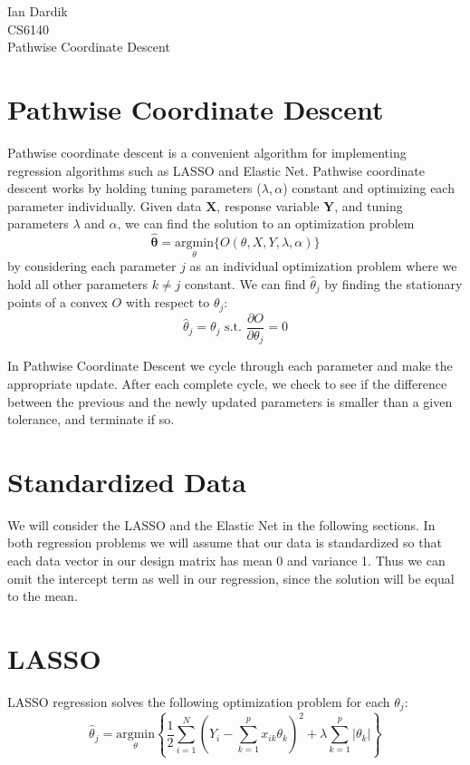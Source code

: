 \documentclass[12pt]{article}
\newcommand{\bY}{\mathbf{Y}}
\newcommand{\bX}{\mathbf{X}}
\newcommand{\thh}{\hat{\theta}}
\begin{document}
Ian Dardik \\
CS6140 \\
Pathwise Coordinate Descent

\section{Pathwise Coordinate Descent}
Pathwise coordinate descent is a convenient algorithm for implementing regression algorithms such as LASSO and Elastic Net.  Pathwise coordinate descent works by holding tuning parameters ($\lambda, \alpha$) constant and optimizing each parameter individually\cite{ht}.  Given data $\bX$, response variable $\bY$, and tuning parameters $\lambda$ and $\alpha$, we can find the solution to an optimization problem
	$$\mathbf{\thh} = \underset{\theta}{\text{argmin}}\{O(\theta,X,Y,\lambda,\alpha)\}$$
by considering each parameter $j$ as an individual optimization problem where we hold all other parameters $k \ne j$ constant.  We can find $\thh_j$ by finding the stationary points of a convex $O$ with respect to $\theta_j$:
	$$\thh_j = \theta_j \text{ s.t. } \frac{\partial O}{\partial \theta_j} = 0$$

In Pathwise Coordinate Descent we cycle through each parameter and make the appropriate update.  After each complete cycle, we check to see if the difference between the previous and the newly updated parameters is smaller than a given tolerance, and terminate if so.  


\section{Standardized Data}
We will consider the LASSO and the Elastic Net in the following sections.  In both regression problems we will assume that our data is standardized so that each data vector in our design matrix has mean 0 and variance 1.  Thus we can omit the intercept term as well in our regression, since the solution will be equal to the mean\cite{ht}.  


\section{LASSO}
LASSO regression solves the following optimization problem for each $\theta_j$\cite{ht}:
	$$\thh_j = \underset{\theta}{\text{argmin}}\left\{ \frac{1}{2} \sum\limits_{i=1}^N \left(Y_i - \sum\limits_{k=1}^px_{ik}\theta_k \right)^2 + \lambda \sum\limits_{k=1}^p|\theta_k| \right\}$$
\end{document}
